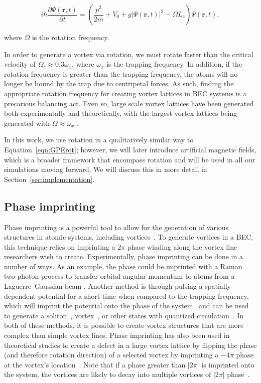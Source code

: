 \begin{equation}
i \hbar \frac{\partial \Psi(\mathbf{r},t)}{\partial t} = \left(\frac{p^2}{2m} + V_0 + g |\Psi(\mathbf{r},t)|^2 -\Omega L_z \right)\Psi(\mathbf{r},t),
\label{eqn:GPErot}
\end{equation}

\noindent where $\Omega$ is the rotation frequency. 


In order to generate a vortex via rotation, we must rotate faster than the critical velocity of $\Omega_c \approx 0.3 \omega_x$, where $\omega_x$ is the trapping frequency.
In addition, if the rotation frequency is greater than the trapping frequency, the atoms will no longer be bound by the trap due to centripetal forces.
As such, finding the appropriate rotation frequency for creating vortex lattices in BEC systems is a precarious balancing act.
Even so, large scale vortex lattices have been generated both experimentally and theoretically, with the largest vortex lattices being generated with $\Omega \approx \omega_x$ \cite{o2016, o2016topo, abo2001, schweikhard2004}.

In this work, we use rotation in a qualitatively similar way to Equation~\eqref{eqn:GPErot}; however, we will later introduce artificial magnetic fields, which is a broader framework that encompass rotation and will be used in all our simulations moving forward.
We will discuss this in more detail in Section~\ref{sec:implementation}.

\subsection{Phase imprinting}

Phase imprinting is a powerful tool to allow for the generation of various structures in atomic systems, including vortices~\cite{kumar2018, moulder2012, burger1999, denschlag2000}.
To generate vortices in a BEC, this technique relies on imprinting a $2\pi$ phase winding along the vortex line researchers wish to create.
Experimentally, phase imprinting can be done in a number of ways.
As an example, the phase could be imprinted with a Raman two-photon process to transfer orbital angular momentum to atoms from a Laguerre--Gaussian beam \cite{moulder2012, ryu2007}.
Another method is through pulsing a spatially dependent potential for a short time when compared to the trapping frequency, which will imprint the potential onto the phase of the system~\cite{kasevich1991} and can be used to generate a soliton~\cite{denschlag2000}, vortex~\cite{gajda1999}, or other states with quantized circulation~\cite{kumar2018}.
In both of these methods, it is possible to create vortex structures that are more complex than simple vortex lines.
Phase imprinting has also been used in theoretical studies to create a defect in a large vortex lattice by flipping the phase (and therefore rotation direction) of a selected vortex by imprinting a $-4\pi$ phase at the vortex's location~\cite{o2016topo}.
Note that if a phase greater than $|2\pi|$ is imprinted onto the system, the vortices are likely to decay into multiple vortices of $|2\pi|$ phase~\cite{shin2004}.

